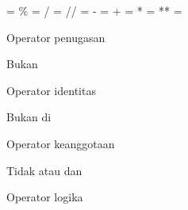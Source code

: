 \vspace{12pt}
\noindent 
= $  \%  $ = / = // = - = + = * = ** = \par
\noindent 
Operator penugasan \par
\vspace{12pt}
\noindent 
Bukan \par
\noindent 
Operator identitas \par
\vspace{12pt}
\noindent 
Bukan di \par
\noindent 
Operator keanggotaan \par
\vspace{12pt}
\noindent 
Tidak atau dan \par
\noindent 
Operator logika \par
\vspace{12pt}
\vspace{12pt}

